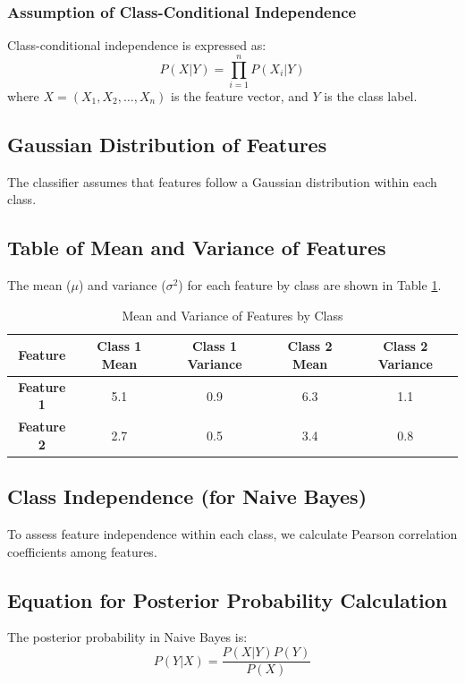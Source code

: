 \documentclass[conference]{IEEEtran}
\begin{document}
	\subsubsection{Assumption of Class-Conditional Independence}
	Class-conditional independence is expressed as:
	\[
	P(X | Y) = \prod_{i=1}^{n} P(X_i | Y)
	\]
	where \( X = (X_1, X_2, \dots, X_n) \) is the feature vector, and \( Y \) is the class label.
	
	\subsection{Gaussian Distribution of Features}
	The classifier assumes that features follow a Gaussian distribution within each class.
	
	\subsection{Table of Mean and Variance of Features}
	The mean (\( \mu \)) and variance (\( \sigma^2 \)) for each feature by class are shown in Table \ref{tab:mean_variance}.
	
\begin{table}[h]
	\centering
	\caption{Mean and Variance of Features by Class}
	\label{tab:mean_variance}
	\begin{tabular}{|c|c|c|c|c|}
		\hline
		\textbf{Feature} & \textbf{Class 1 Mean} & \textbf{Class 1 Variance} & \textbf{Class 2 Mean} & \textbf{Class 2 Variance} \\
		\hline
		\textbf{Feature 1} & 5.1 & 0.9 & 6.3 & 1.1 \\
		\textbf{Feature 2} & 2.7 & 0.5 & 3.4 & 0.8 \\
		\hline
	\end{tabular}
\end{table}

	
	\subsection{Class Independence (for Naive Bayes)}\label{CI}
	To assess feature independence within each class, we calculate Pearson correlation coefficients among features.
	
	\subsection{Equation for Posterior Probability Calculation}
	The posterior probability in Naive Bayes is:
	\[
	P(Y|X) = \frac{P(X|Y) P(Y)}{P(X)}
	\]
	
\end{document}
